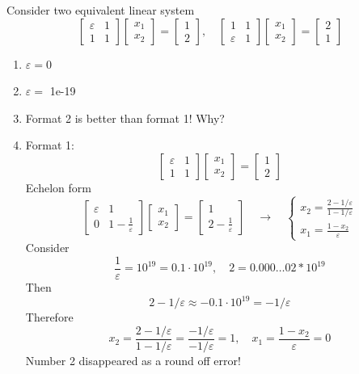 \documentclass{article}
\theoremstyle{remark}
\begin{document}
\begin{enumerate}
\begin{enumerate}
Consider two equivalent linear system
$$
\begin{bmatrix}
\varepsilon & 1\\
1 & 1
\end{bmatrix}
\begin{bmatrix}
x_1\\x_2
\end{bmatrix} = \begin{bmatrix}
1\\2
\end{bmatrix},\quad 
\begin{bmatrix}
1 & 1\\
\varepsilon & 1
\end{bmatrix}
\begin{bmatrix}
x_1\\x_2
\end{bmatrix} = \begin{bmatrix}
2\\1
\end{bmatrix}
$$
\begin{enumerate}
\item $\varepsilon = 0$
\item $\varepsilon = $ 1e-19
\item Format 2 is better than format 1!  Why?
\item Format 1: 
$$
\begin{bmatrix}
\varepsilon & 1\\
1 & 1
\end{bmatrix}
\begin{bmatrix}
x_1\\x_2
\end{bmatrix} = 
\begin{bmatrix}
1\\2
\end{bmatrix}
$$
Echelon form
$$
\begin{bmatrix}
\varepsilon & 1\\
0 & 1-\displaystyle \frac{1}{\varepsilon}
\end{bmatrix}
\begin{bmatrix}
x_1\\x_2
\end{bmatrix} = \begin{bmatrix}
1\\2 - \displaystyle \frac{1}{\varepsilon}
\end{bmatrix}\quad \rightarrow\quad \left\{
\begin{array}{l}
\displaystyle x_2 = \frac{2-1/\varepsilon}{1-1/\varepsilon}\\[0.2in]
\displaystyle x_1 = \frac{1-x_2}{\varepsilon}
\end{array}\right.
$$
Consider
$$
\frac{1}{\varepsilon} = 10^{19} = 0.1 \cdot 10^{19},\quad 2 = 0.000 \dots 02*10^{19}
$$
Then 
$$
2-1/\varepsilon \approx -0.1 \cdot 10^{19} = -1/\varepsilon
$$
Therefore
$$
x_2 = \frac{2-1/\varepsilon}{1-1/\varepsilon} = \frac{-1/\varepsilon}{-1/\varepsilon}=1,\quad \displaystyle x_1 = \frac{1-x_2}{\varepsilon} = 0
$$
Number 2 disappeared as a round off error!
\end{enumerate}


\end{enumerate}
\end{enumerate}
\end{document}

